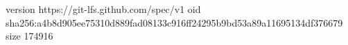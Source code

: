 version https://git-lfs.github.com/spec/v1
oid sha256:a4b8d905ee75310d889fad08133c916ff24295b9bd53a89a11695134df376679
size 174916
